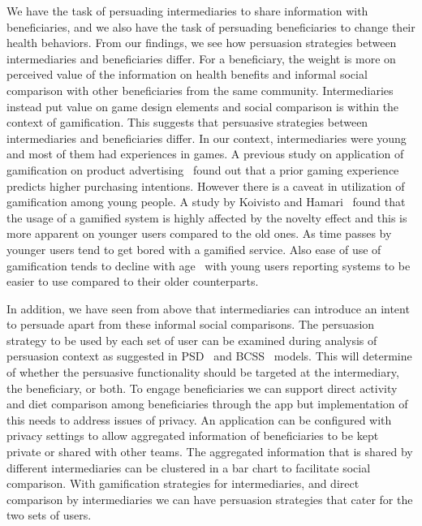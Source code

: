 \documentclass{sig-alternate}
\begin{document}
We have the task of persuading intermediaries to share information with
beneficiaries, and we also have the task of persuading beneficiaries to change
their health behaviors. From our findings, we see how persuasion strategies
between intermediaries and beneficiaries differ. For a beneficiary, the 
weight is more on perceived value of the information on health benefits 
and informal social comparison with other beneficiaries from the same 
community. Intermediaries instead put value on
game design elements and social comparison is within the context of
gamification. This suggests that persuasive strategies between 
intermediaries and beneficiaries differ. In our context, intermediaries 
were young and most of them had experiences in games. A previous study 
on application of gamification on 
product advertising~\cite{v2014motivational} found out that a prior 
gaming experience predicts higher purchasing intentions. However there 
is a caveat in utilization of gamification among young people. A study 
by Koivisto and Hamari~\cite{koivisto2014demographic} found that the 
usage of  a gamified system is highly affected by the novelty effect 
and this is more apparent on younger users compared to the old ones. As 
time passes by younger users tend to get bored with a gamified service. 
Also ease of use of gamification tends to decline with 
age~\cite{koivisto2014demographic} with young users reporting 
systems to be easier to use compared to their older counterparts.  


In addition, we have seen from above that intermediaries can introduce 
an intent to persuade apart from these informal social comparisons. The 
persuasion strategy to be used by each set of user can be examined 
during analysis of persuasion context as suggested in 
PSD~\cite{Oinas-Kukkonen:foundation}  and BCSS~\cite{Oinas-kukkonen:psd}
models. This will determine of whether the persuasive functionality 
should be targeted at the intermediary, the beneficiary, or both. 
To engage 
beneficiaries we  can support direct activity and diet comparison among 
beneficiaries through the app but implementation of this needs to 
address issues of privacy. An application can be configured with 
privacy settings to allow aggregated information of beneficiaries to be 
kept private or shared with other teams. The aggregated information 
that is shared by different intermediaries can be clustered in a bar 
chart to facilitate social comparison. With gamification strategies for 
intermediaries, and direct comparison by intermediaries we can have 
persuasion strategies that cater for the two sets of users.
\end{document}
